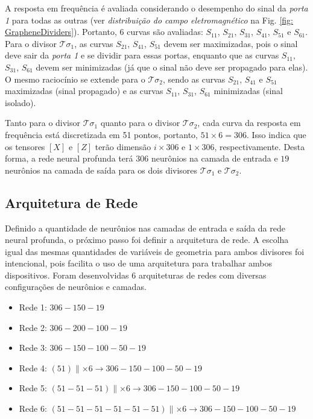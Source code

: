 A resposta em frequência é avaliada considerando o desempenho do sinal da \textit{porta 1} para todas as outras (ver \textit{distribuição do campo eletromagnético} na Fig. \ref{fig: GrapheneDividers}). Portanto, $6$ curvas são avaliadas: $S_{11}$, $S_{21}$, $S_{31}$, $S_{41}$, $S_{51}$ e $S_{61}$. Para o divisor $\mathcal{T}\sigma_{1}$, as curvas $S_{21}$, $S_{41}$, $S_{51}$ devem ser maximizadas, pois o sinal deve sair da \textit{porta 1} e se dividir para essas portas, enquanto que as curvas $S_{11}$, $S_{31}$, $S_{61}$ devem ser minimizadas (já que o sinal não deve ser propagado para elas). O mesmo raciocínio se extende para o $\mathcal{T}\sigma_{2}$, sendo as curvas $S_{21}$, $S_{41}$ e $S_{51}$ maximizadas (sinal propagado) e as curvas $S_{11}$, $S_{31}$, $S_{61}$ minimizadas (sinal isolado).


Tanto para o divisor $\mathcal{T}\sigma_{1}$ quanto para o divisor $\mathcal{T}\sigma_{2}$, cada curva da resposta em frequência está discretizada em 51 pontos, portanto, $51 \times 6 = 306$. Isso indica que os tensores $[X]$ e $[Z]$ terão dimensão $i \times 306$ e $1 \times 306$, respectivamente. Desta forma, a rede neural profunda terá $306$ neurônios na camada de entrada e $19$ neurônios na camada de saída para os dois divisores $\mathcal{T}\sigma_{1}$ e $\mathcal{T}\sigma_{2}$.


\subsection{Arquitetura de Rede}

Definido a quantidade de neurônios nas camadas de entrada e saída da rede neural profunda, o próximo passo foi definir a arquitetura de rede. A escolha igual das mesmas quantidades de variáveis de geometria para ambos divisores foi intencional, pois facilita o uso de uma arquitetura para trabalhar ambos dispositivos. Foram desenvolvidas 6 arquiteturas de redes com diversas configurações de neurônios e camadas.

\begin{itemize}
    \item Rede 1: $306 - 150 - 19$
    \item Rede 2: $306 - 200 - 100 - 19$
    \item Rede 3: $306 - 150 - 100 - 50 - 19$
    \item Rede 4: $(51) \parallel \times 6 \rightarrow 306 - 150 - 100 - 50 - 19$
    \item Rede 5: $(51 - 51 - 51) \parallel \times 6 \rightarrow 306 - 150 - 100 - 50 - 19$
    \item Rede 6: $(51 - 51 - 51 - 51 - 51 - 51) \parallel \times 6 \rightarrow 306 - 150 - 100 - 50 - 19$
\end{itemize}

